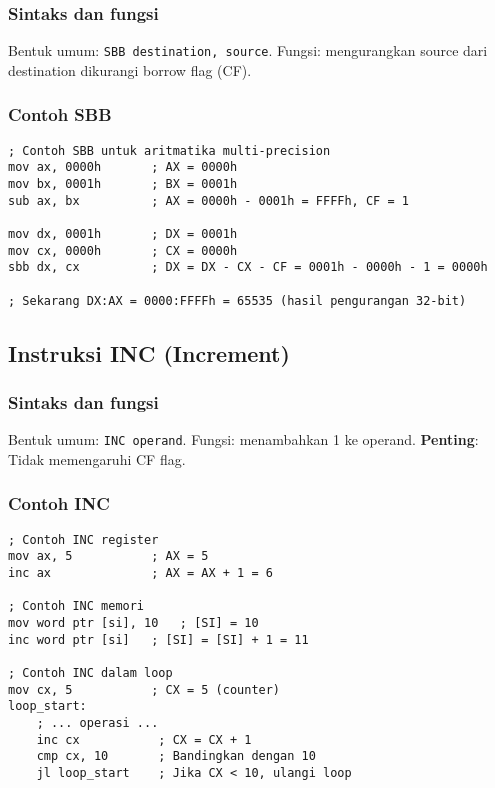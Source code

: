 \documentclass[../main.tex]{subfiles}
\begin{document}
            \subsubsection{Sintaks dan fungsi}
Bentuk umum: \texttt{SBB destination, source}. Fungsi: mengurangkan source dari destination dikurangi borrow flag (CF).

            \subsubsection{Contoh SBB}
\begin{lstlisting}[language={[x86masm]Assembler}, caption=Instruksi SBB, label={lst:sbb-examples}]
; Contoh SBB untuk aritmatika multi-precision
mov ax, 0000h       ; AX = 0000h
mov bx, 0001h       ; BX = 0001h
sub ax, bx          ; AX = 0000h - 0001h = FFFFh, CF = 1

mov dx, 0001h       ; DX = 0001h
mov cx, 0000h       ; CX = 0000h
sbb dx, cx          ; DX = DX - CX - CF = 0001h - 0000h - 1 = 0000h

; Sekarang DX:AX = 0000:FFFFh = 65535 (hasil pengurangan 32-bit)
\end{lstlisting}

        \subsection{Instruksi INC (Increment)}
            \subsubsection{Sintaks dan fungsi}
Bentuk umum: \texttt{INC operand}. Fungsi: menambahkan 1 ke operand. \textbf{Penting}: Tidak memengaruhi CF flag.

            \subsubsection{Contoh INC}
\begin{lstlisting}[language={[x86masm]Assembler}, caption=Instruksi INC, label={lst:inc-examples}]
; Contoh INC register
mov ax, 5           ; AX = 5
inc ax              ; AX = AX + 1 = 6

; Contoh INC memori
mov word ptr [si], 10   ; [SI] = 10
inc word ptr [si]   ; [SI] = [SI] + 1 = 11

; Contoh INC dalam loop
mov cx, 5           ; CX = 5 (counter)
loop_start:
    ; ... operasi ...
    inc cx           ; CX = CX + 1
    cmp cx, 10       ; Bandingkan dengan 10
    jl loop_start    ; Jika CX < 10, ulangi loop
\end{lstlisting}
\end{document}
